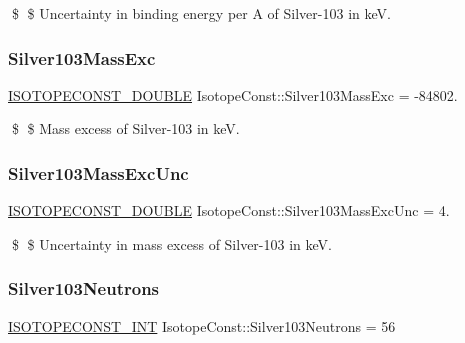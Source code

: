 \$ \$ Uncertainty in binding energy per A of Silver-\/103 in keV. \mbox{\label{group___isotope_const-_silver-_ag103_ga427e8c7e97a84a1f3458ddbed5f6f5f2}} 
\subsubsection{\texorpdfstring{Silver103\+Mass\+Exc}{Silver103MassExc}}
{\footnotesize\ttfamily \mbox{\hyperlink{group___isotope_const-_macros_ga8f45a7272ce02c0b4c65c44636ed719a}{I\+S\+O\+T\+O\+P\+E\+C\+O\+N\+S\+T\+\_\+\+D\+O\+U\+B\+LE}} Isotope\+Const\+::\+Silver103\+Mass\+Exc = -\/84802.}

\$ \$ Mass excess of Silver-\/103 in keV. \mbox{\label{group___isotope_const-_silver-_ag103_gaf868657cacebe4aaaefcf1a81887349b}} 
\subsubsection{\texorpdfstring{Silver103\+Mass\+Exc\+Unc}{Silver103MassExcUnc}}
{\footnotesize\ttfamily \mbox{\hyperlink{group___isotope_const-_macros_ga8f45a7272ce02c0b4c65c44636ed719a}{I\+S\+O\+T\+O\+P\+E\+C\+O\+N\+S\+T\+\_\+\+D\+O\+U\+B\+LE}} Isotope\+Const\+::\+Silver103\+Mass\+Exc\+Unc = 4.}

\$ \$ Uncertainty in mass excess of Silver-\/103 in keV. \mbox{\label{group___isotope_const-_silver-_ag103_ga22a227b2dc6059d8aeef4af6a2bf69c6}} 
\subsubsection{\texorpdfstring{Silver103\+Neutrons}{Silver103Neutrons}}
{\footnotesize\ttfamily \mbox{\hyperlink{group___isotope_const-_macros_ga5f18360b3e99483a35c32d789e62621c}{I\+S\+O\+T\+O\+P\+E\+C\+O\+N\+S\+T\+\_\+\+I\+NT}} Isotope\+Const\+::\+Silver103\+Neutrons = 56}

